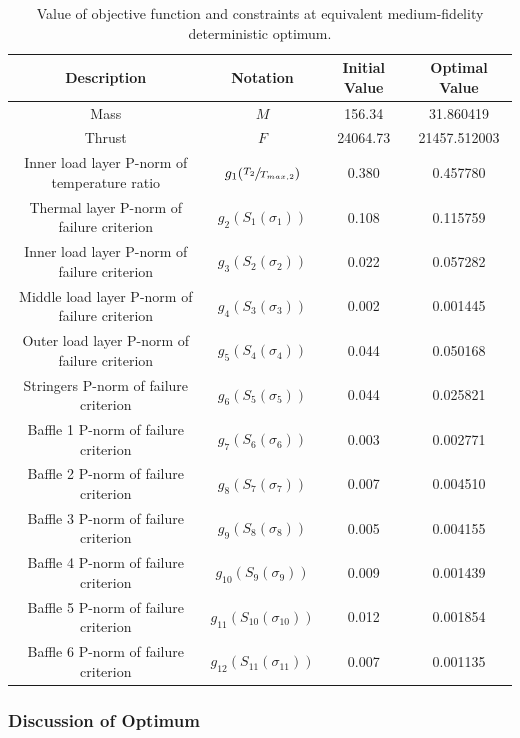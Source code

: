 \documentclass{article}
\begin{document}
\begin{table}
\caption[Equivalent medium-fidelity deterministic optimization objective and constraint values]{Value of objective function and constraints at equivalent medium-fidelity deterministic optimum.}
\label{tab:det-med-optimal-values}
\begin{center}
\begin{tabular}[]{ c | c | c | c }
\textbf{Description} & \textbf{Notation} & \textbf{Initial Value} & \textbf{Optimal Value} \\ \hline
Mass & $M$ & 156.34  & 31.860419 \\ \hline
Thrust & $F$ & 24064.73 & 21457.512003 \\ \hline
Inner load layer P-norm of temperature ratio & $g_1(\sfrac{T_2}{T_{max,2}})$ & 0.380 & 0.457780 \\ \hline
Thermal layer P-norm of failure criterion & $g_2(S_1(\sigma_1))$ & 0.108 & 0.115759 \\ \hline
Inner load layer P-norm of failure criterion & $g_3(S_2(\sigma_2))$ & 0.022 & 0.057282 \\ \hline
Middle load layer P-norm of failure criterion & $g_4(S_3(\sigma_3))$ & 0.002 & 0.001445 \\ \hline
Outer load layer P-norm of failure criterion & $g_5(S_4(\sigma_4))$ & 0.044 & 0.050168 \\ \hline
Stringers P-norm of failure criterion & $g_6(S_5(\sigma_5))$ & 0.044 & 0.025821 \\ \hline
Baffle 1 P-norm of failure criterion & $g_7(S_6(\sigma_6))$ & 0.003 & 0.002771 \\ \hline
Baffle 2 P-norm of failure criterion & $g_8(S_7(\sigma_7))$ & 0.007 & 0.004510 \\ \hline
Baffle 3 P-norm of failure criterion & $g_9(S_8(\sigma_8))$ & 0.005 & 0.004155 \\ \hline
Baffle 4 P-norm of failure criterion & $g_{10}(S_9(\sigma_9))$ & 0.009 & 0.001439 \\ \hline
Baffle 5 P-norm of failure criterion & $g_{11}(S_{10}(\sigma_{10}))$ & 0.012 & 0.001854 \\ \hline
Baffle 6 P-norm of failure criterion & $g_{12}(S_{11}(\sigma_{11}))$ & 0.007 & 0.001135 \\ \hline
\end{tabular}
\end{center}
\end{table}

\subsubsection{Discussion of Optimum}
\end{document}
